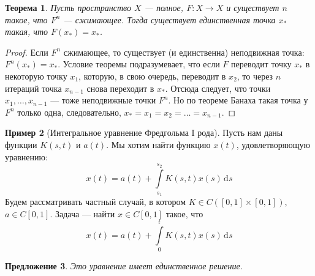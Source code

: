 \documentclass[11pt,openany,a4paper]{scrartcl}
\theoremstyle{plain}
\newtheorem{theorem}{Теорема}[subsection]
\newtheorem{proposition}[theorem]{Предложение}
\theoremstyle{definition}
\newtheorem{example}[theorem]{Пример}
\newcommand{\dif}{\, \mathrm d}
\begin{document}
\begin{theorem}
    Пусть пространство $X$ — полное, $F: X \to X$ и существует $n$ такое, что
    $F^n$ — сжимающее. Тогда существует единственная точка $x_\ast$ такая, что
    $F(x_\ast) = x_\ast$.
\end{theorem}
\begin{proof}
    Если $F^n$ сжимающее, то существует (и единственна) неподвижная точка:
    $F^n(x_\ast) = x_\ast$.
    Условие теоремы подразумевает, что если $F$ переводит точку $x_\ast$ в
    некоторую точку $x_1$, которую, в свою очередь, переводит в $x_2$, то через
    $n$ итераций точка $x_{n-1}$ снова переходит в $x_\ast$. Отсюда следует,
    что точки $x_1,\ldots,x_{n-1}$ — тоже неподвижные точки $F^n$. Но по теореме
    Банаха такая точка у $F^n$ только одна, следовательно,
    $x_\ast = x_1 = x_2 = \ldots = x_{n-1}$.
\end{proof}
\begin{example}[Интегральное уравнение Фредгольма I рода]
    Пусть нам даны функции $K(s,t)$ и $a(t)$. Мы хотим найти функцию $x(t)$,
    удовлетворяющую уравнению:
    $$
    x(t) = a(t) + \int\limits_{s_1}^{s_2} K(s,t) x(s) \dif s
    $$
    Будем рассматривать частный случай, в котором $K \in C([0,1]\times[0,1])$,
    $a \in C[0,1]$. Задача — найти $x \in C[0,1]$ такое, что
    $$
    x(t) = a(t) + \int\limits_0^t K(s,t) x(s) \dif s
    $$
\end{example}
\begin{proposition}
    Это уравнение имеет единственное решение.
\end{proposition}
\end{document}
